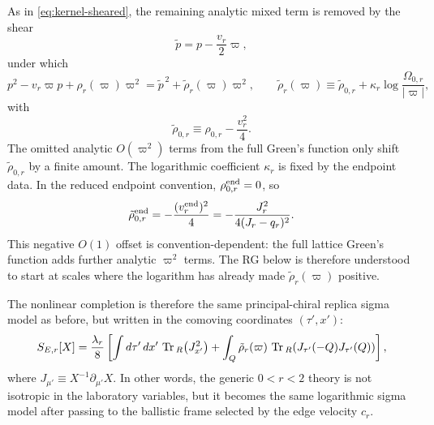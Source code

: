 \documentclass[aps,prx,preprint,amsmath,amssymb]{revtex4-2}
\newcommand{\Tr}{{\rm \, Tr\,}}
\begin{document}
As in \eqref{eq:kernel-sheared}, the remaining analytic mixed term is removed by
the shear
\begin{equation}
\tilde p=p-\frac{v_r}{2}\varpi,
\end{equation}
under which
\begin{equation}\label{eq:generic-r-kernel-sheared}
p^2-v_r\varpi p+\rho_r(\varpi)\varpi^2
=
\tilde p^{\,2}
+\tilde\rho_r(\varpi)\varpi^2,
\qquad
\tilde\rho_r(\varpi)
\equiv
\tilde\rho_{0,r}
+\kappa_r\log\!\frac{\Omega_{0,r}}{|\varpi|},
\end{equation}
with
\begin{equation}
\tilde\rho_{0,r}\equiv \rho_{0,r}-\frac{v_r^2}{4}.
\end{equation}
The omitted analytic \(O(\varpi^2)\) terms from the full Green's function only
shift \(\tilde\rho_{0,r}\) by a finite amount.  The logarithmic coefficient
\(\kappa_r\) is fixed by the endpoint data.  In the reduced endpoint
convention, \(\rho_{0,r}^{\rm end}=0\), so
\begin{equation}
\tilde\rho_{0,r}^{\rm end}
=
-\frac{(v_r^{\rm end})^2}{4}
=
-\frac{J_r^2}{4(J_r-q_r)^2}.
\end{equation}
This negative \(O(1)\) offset is convention-dependent: the full lattice Green's
function adds further analytic \(\varpi^2\) terms.  The RG below is therefore
understood to start at scales where the logarithm has already made
\(\tilde\rho_r(\varpi)\) positive.

The nonlinear completion is therefore the same principal-chiral replica sigma
model as before, but written in the comoving coordinates
\((\tau',x')\):
\begin{equation}\label{eq:SE-X-generic-r}
S_{E,r}[X]
=
\frac{\lambda_r}{8}
\left[
\int d\tau'\,dx'\,\Tr_R\!\left(J_{x'}^2\right)
+\int_Q \tilde\rho_r(\varpi)\,
\Tr_R\!\left(J_{\tau'}(-Q)J_{\tau'}(Q)\right)
\right],
\end{equation}
where \(J_{\mu'}\equiv X^{-1}\partial_{\mu'}X\).  In other words, the generic
\(0<r<2\) theory is not isotropic in the laboratory variables, but it becomes
the same logarithmic sigma model after passing to the ballistic frame selected
by the edge velocity \(c_r\).
\end{document}
